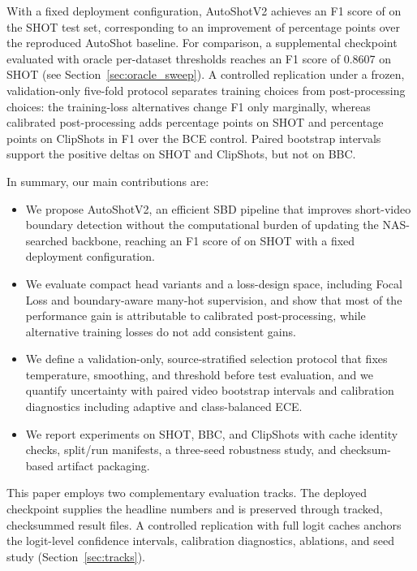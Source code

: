 With a fixed deployment configuration, AutoShotV2 achieves an F1 score of \PaperDeployShotFOne{} on the SHOT test set, corresponding to an improvement of \PaperDeployVsAutoShotPP{} percentage points over the reproduced AutoShot baseline. For comparison, a supplemental checkpoint evaluated with oracle per-dataset thresholds reaches an F1 score of 0.8607 on SHOT (see Section~\ref{sec:oracle_sweep}). A controlled replication under a frozen,
validation-only
five-fold protocol separates training choices from post-processing choices:
the training-loss alternatives change F1 only marginally, whereas calibrated
post-processing adds \PaperBFourVsAOneShotPP{} percentage points on SHOT
and \PaperBFourVsAOneClipPP{} percentage points on ClipShots in F1 over the
BCE control.
Paired bootstrap intervals support the positive deltas on SHOT and
ClipShots, but not on BBC.

In summary, our main contributions are:
\begin{itemize}
\item We propose AutoShotV2, an efficient SBD pipeline that improves
short-video boundary detection without the computational burden of
updating the NAS-searched backbone, reaching an F1 score of
\PaperDeployShotFOne{} on SHOT with a fixed deployment configuration.
\item We evaluate compact head variants and a loss-design space, including
Focal Loss and boundary-aware many-hot supervision, and show that most of the
performance gain is attributable to calibrated post-processing, while
alternative training losses do not add consistent gains.
\item We define a validation-only, source-stratified selection protocol that
fixes temperature, smoothing, and threshold before test evaluation, and we
quantify uncertainty with paired video bootstrap intervals and calibration
diagnostics including adaptive and class-balanced ECE.
\item We report experiments on SHOT, BBC, and ClipShots with cache identity
checks, split/run manifests, a three-seed robustness study, and
checksum-based artifact packaging.
\end{itemize}

This paper employs two complementary evaluation tracks. The deployed checkpoint
supplies the headline numbers and is preserved through tracked,
checksummed result files. A controlled replication with full logit caches
anchors the logit-level confidence intervals, calibration diagnostics,
ablations, and seed study (Section~\ref{sec:tracks}).
